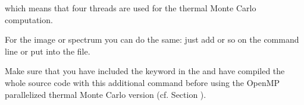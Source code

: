 \documentclass[letterpaper,10pt,english]{sphinxmanual}
\begin{document}
which means that four threads are used for the thermal Monte Carlo computation.

For the image or spectrum you can do the same: just add  or so
on the command line or put  into the  file.

Make sure that you have included the  keyword in the 
and have compiled the whole  source code with this additional command
before using the OpenMP parallelized thermal Monte Carlo version (cf. Section
{\hyperref[\detokenize{installation:sec-makeing}]{}}).
\end{document}
